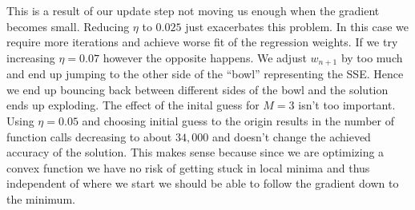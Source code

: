 \documentclass[10pt]{article}
\begin{document}
This is a result of our update step not moving us enough when the gradient becomes small. Reducing $\eta$ to $0.025$ just exacerbates this problem. In this case we require more iterations and achieve worse fit of the regression weights. If we try increasing $\eta = 0.07$ however the opposite happens. We adjust $w_{n+1}$ by too much and end up jumping to the other side of the ``bowl'' representing the SSE. Hence we end up bouncing back between different sides of the bowl and the solution ends up exploding. The effect of the inital guess for $M = 3$ isn't too important. Using $\eta = 0.05$ and choosing initial guess to the origin results in the number of function calls decreasing to about $34,000$ and doesn't change the achieved accuracy of the solution. This makes sense because since we are optimizing a convex function we have no risk of getting stuck in local minima and thus independent of where we start we should be able to follow the gradient down to the minimum.
\end{document}
